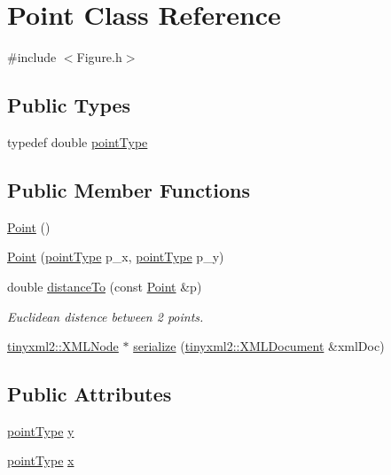 \hypertarget{class_point}{}\section{Point Class Reference}
\label{class_point}


{\ttfamily \#include $<$Figure.\+h$>$}

\subsection*{Public Types}
\begin{DoxyCompactItemize}
\item 
typedef double \hyperlink{class_point_a00b37528c0db634a12ecee9b29d79579}{point\+Type}
\end{DoxyCompactItemize}
\subsection*{Public Member Functions}
\begin{DoxyCompactItemize}
\item 
\hyperlink{class_point_ad92f2337b839a94ce97dcdb439b4325a}{Point} ()
\item 
\hyperlink{class_point_a4246ef6d69a6d29d1b9d1e225a9db964}{Point} (\hyperlink{class_point_a00b37528c0db634a12ecee9b29d79579}{point\+Type} p\+\_\+x, \hyperlink{class_point_a00b37528c0db634a12ecee9b29d79579}{point\+Type} p\+\_\+y)
\item 
double \hyperlink{class_point_a2707cf08d246f96e7ae16e6c1d6ce4f7}{distance\+To} (const \hyperlink{class_point}{Point} \&p)
\begin{DoxyCompactList}\small\item\em Euclidean distence between 2 points. \end{DoxyCompactList}\item 
\hyperlink{classtinyxml2_1_1_x_m_l_node}{tinyxml2\+::\+X\+M\+L\+Node} $\ast$ \hyperlink{class_point_a1d435eb5b4bc2bdaa92c596eb7728edc}{serialize} (\hyperlink{classtinyxml2_1_1_x_m_l_document}{tinyxml2\+::\+X\+M\+L\+Document} \&xml\+Doc)
\end{DoxyCompactItemize}
\subsection*{Public Attributes}
\begin{DoxyCompactItemize}
\item 
\hyperlink{class_point_a00b37528c0db634a12ecee9b29d79579}{point\+Type} \hyperlink{class_point_ae818271b839c768a11dfff7f3bf27b08}{y}
\item 
\hyperlink{class_point_a00b37528c0db634a12ecee9b29d79579}{point\+Type} \hyperlink{class_point_a76ee561a1b35e86084466b81b9835311}{x}
\end{DoxyCompactItemize}


